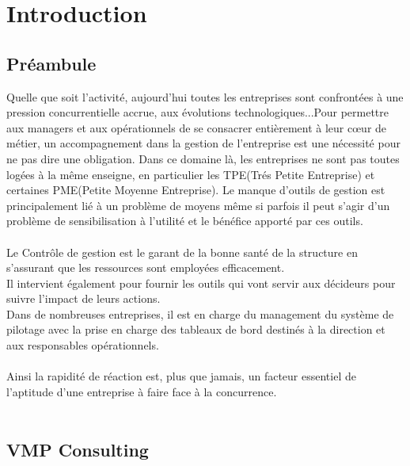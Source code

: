 \documentclass[12pt]{article}
\begin{document}
\newpage
\renewcommand{\contentsname}{Sommaire}
\tableofcontents
\newpage



\section{Introduction}

\subsection{Préambule}

Quelle que soit l’activité, aujourd’hui toutes les entreprises sont confrontées à une pression concurrentielle accrue, aux évolutions technologiques...Pour permettre aux managers et aux opérationnels de se consacrer entièrement à leur cœur de métier, un accompagnement dans la gestion de l'entreprise est une nécessité pour ne pas dire une obligation. Dans ce domaine là, les entreprises ne sont pas toutes logées à la même enseigne, en particulier les TPE(Trés Petite Entreprise) et certaines PME(Petite Moyenne Entreprise). Le manque d’outils de gestion est principalement lié à un problème de moyens même si parfois il peut s’agir d’un problème de sensibilisation à l’utilité et le bénéfice apporté par ces outils.\\ \\

Le Contrôle de gestion est le garant de la bonne santé de la structure en s'assurant que les ressources sont employées efficacement.\\ 
Il intervient également pour fournir les outils qui vont servir aux décideurs pour suivre l'impact de leurs actions. \\

Dans de nombreuses entreprises, il est en charge du management du système de pilotage avec la prise en charge des tableaux de bord destinés à la direction et aux responsables opérationnels.\\ \\

Ainsi la rapidité de réaction est, plus que jamais, un facteur essentiel de l’aptitude 
d’une  entreprise  à faire  face  à la  concurrence.\\ \\

 


\subsection{VMP Consulting}
\end{document}
